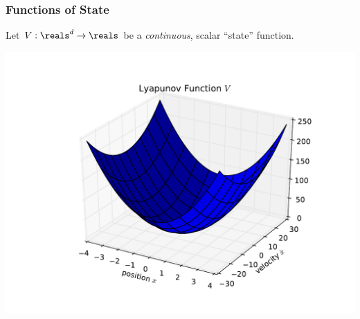 \documentclass[12pt]{beamer}
\begin{document}
\begin{frame}
\frametitle{Functions of State}

\begin{itemize}
\vitem
Let $V : \reals^d \to \reals$ be a \emph{continuous}, scalar ``state'' function.
\end{itemize}

\begin{center}
\includegraphics[width=.9\linewidth]{smd_V}
\end{center}

\end{frame}
\end{document}
